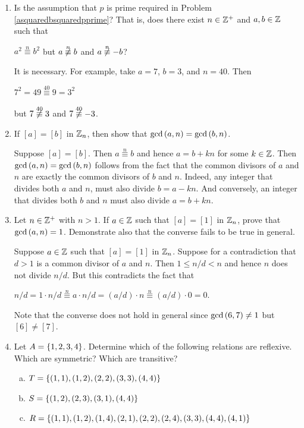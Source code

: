 \documentclass[11pt,fleqn,dvipsnames,usenames]{article}
\newcommand{\p}{\noindent}
\begin{document}
\begin{enumerate}
\item Is the assumption that $p$ is prime required in Problem \ref{asquaredbsquaredpprime}?  That is, does there exist $n\in\mathbb{Z}^{+}$ and $a,b\in\mathbb{Z}$ such that
\begin{center}
$a^2\overset{n}{\equiv}b^2$ but $a\not\overset{n}{\equiv}b$ and $a\not\overset{n}{\equiv}-b$?
\end{center}
\vsmsp

\solution It is necessary.  For example, take $a = 7$, $b=3$, and $n=40$.  Then
\begin{center}
$7^2 = 49 \overset{40}{\equiv}9 = 3^2$
\end{center}
but $7\not\overset{40}{\equiv}3$ and $7\not\overset{40}{\equiv}-3$.

\item If $[a] = [b]$ in $\mathbb{Z}_{n}$, then show that $\text{gcd}\left(a,n\right) = \text{gcd}\left(b,n\right)$.
\vsmsp

\solution Suppose $[a] = [b]$.  Then $a\overset{n}{\equiv}b$ and hence $a = b + kn$ for some $k\in\mathbb{Z}$.  Then $\text{gcd}\left(a,n\right) = \text{gcd}\left(b,n\right)$ follows from the fact that the common divisors of $a$ and $n$ are exactly the common divisors of $b$ and $n$.  Indeed, any integer that divides both $a$ and $n$, must also divide $b = a - kn$.  And conversely, an integer that divides both $b$ and $n$ must also divide $a = b + kn$.

\item Let $n\in\mathbb{Z}^{+}$ with $n > 1$.  If $a\in \mathbb{Z}$ such that $[a] = [1]$ in $\mathbb{Z}_{n}$, prove that $\text{gcd}\left(a,n\right) = 1$.  Demonstrate also that the converse fails to be true in general.
\vsmsp

\solution Suppose $a\in\mathbb{Z}$ such that $[a] = [1]$ in $\mathbb{Z}_{n}$.  Suppose for a contradiction that $d>1$ is a common divisor of $a$ and $n$.  Then $1 \leq n/d < n$ and hence $n$ does not divide $n/d$.  But this contradicts the fact that
\begin{center}
$n/d = 1\cdot n/d \overset{n}{\equiv} a\cdot n/d = (a/d)\cdot n \overset{n}{\equiv}(a/d)\cdot 0 = 0$.
\end{center}
\vsmsp

\p Note that the converse does not hold in general since $\text{gcd}\left(6,7\right)\neq 1$ but $[6]\neq [7]$.

\item Let $A = \left\{1,2,3,4\right\}$.  Determine which of the following relations are reflexive.  Which are symmetric?  Which are transitive?
\begin{enumerate}[(a)]
\item $T = \left\{(1,1), (1,2), (2,2), (3,3), (4,4)\right\}$
\item $S = \left\{(1,2), (2,3), (3,1), (4,4)\right\}$
\item $R = \left\{(1,1), (1,2), (1,4), (2,1), (2,2), (2,4), (3,3), (4,4), (4,1)\right\}$
\end{enumerate}
\vsmsp


\end{enumerate}
\end{document}
